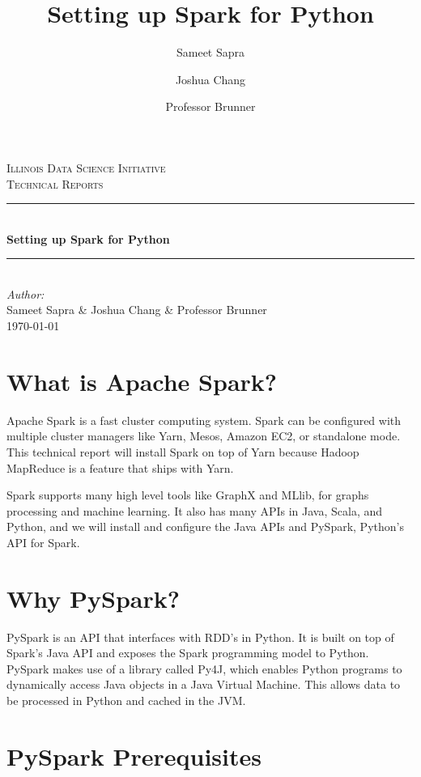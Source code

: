 \documentclass[9pt,twocolumn,twoside]{idsi}
\author[1]{Sameet Sapra}
\author[2]{Joshua Chang}
\author[3]{Professor Brunner}
\title{Setting up Spark for Python}
\newcommand{\HRule}{\rule{\linewidth}{0.5mm}}
\begin{document}
\begin{titlepage}
\center 
\textsc{\LARGE Illinois Data Science Initiative}\\[1.5cm] 
\textsc{\Large Technical Reports}\\[0.5cm] \HRule \\[0.4cm]
{\huge \bfseries Setting up Spark for Python } \\[0.4cm] \HRule \\[1.5cm]
\Large \emph{Author:}\\ Sameet Sapra \& Joshua Chang \& Professor Brunner\\[3cm]
{\large \today}\\[3cm] %
\vfill
\end{titlepage}
%

\maketitle

\section{What is Apache Spark?}

Apache Spark is a fast cluster computing system. Spark can be configured with multiple cluster managers like Yarn, Mesos, Amazon EC2, or standalone mode. This technical report will install Spark on top of Yarn because Hadoop MapReduce is a feature that ships with Yarn.

Spark supports many high level tools like GraphX and MLlib, for graphs processing and machine learning. It also has many APIs in Java, Scala, and Python, and we will install and configure the Java APIs and PySpark, Python's API for Spark.

\section{Why PySpark?}

PySpark is an API that interfaces with RDD's in Python. It is built on top of Spark's Java API and exposes the Spark programming model to Python. PySpark makes use of a library called Py4J, which enables Python programs to dynamically access Java objects in a Java Virtual Machine. This allows data to be processed in Python and cached in the JVM.

\section{PySpark Prerequisites}
\end{document}
